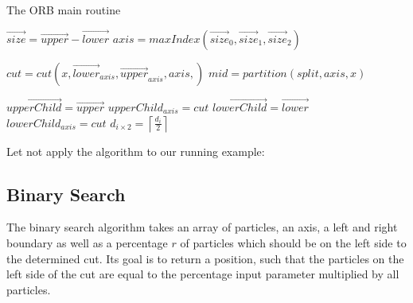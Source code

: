 \documentclass[]{article}
\begin{document}
\begin{algorithm}[H]
	\caption{The ORB main routine}\label{euclid}
	\begin{algorithmic}[1]
		\State $\vec{size} = \vec{upper} - \vec{lower}$
		\State $axis = maxIndex(\vec{size}_0, \vec{size}_1, \vec{size}_2)$ 
		\newline
		
		\State $cut = cut(x, \vec{lower}_{axis}, \vec{upper}_{axis}, axis, )$
		\State $mid = partition(split, axis, x)$
		\newline
		
		\State $\vec{upperChild} = \vec{upper}$
		\State $upperChild_{axis} = cut$
		\State $\vec{lowerChild} = \vec{lower}$
		\State $lowerChild_{axis} = cut$
		\State $d_{i \times 2 } = \left \lceil\frac{d_{i}}{2} \right \rceil$
		\State {}
		\EndProcedure
	\end{algorithmic}
\end{algorithm}

Let not apply the algorithm to our running example:


\subsection{Binary Search}



 The binary search algorithm takes an array of particles, an axis, a left and right boundary as well as a percentage $r$ of particles which should be on the left side to the determined cut. Its goal is to return a position, such that the particles on the left side of the cut are equal to the percentage input parameter multiplied by all particles.
 
\end{document}
